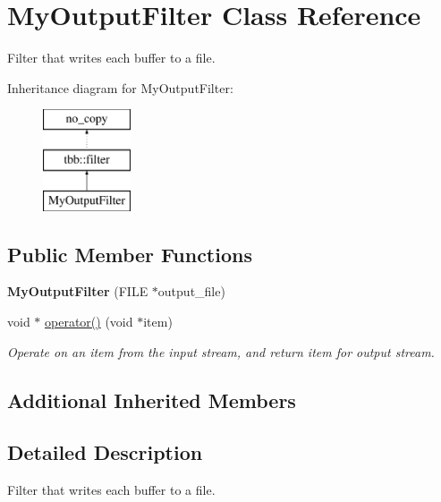 \hypertarget{classMyOutputFilter}{}\section{My\+Output\+Filter Class Reference}
\label{classMyOutputFilter}


Filter that writes each buffer to a file.  


Inheritance diagram for My\+Output\+Filter\+:\begin{figure}[H]
\begin{center}
\leavevmode
\includegraphics[height=3.000000cm]{classMyOutputFilter}
\end{center}
\end{figure}
\subsection*{Public Member Functions}
\begin{DoxyCompactItemize}
\item 
\hypertarget{classMyOutputFilter_acbfd306d9f83e508ab169829ef435c49}{}{\bfseries My\+Output\+Filter} (F\+I\+L\+E $\ast$output\+\_\+file)\label{classMyOutputFilter_acbfd306d9f83e508ab169829ef435c49}

\item 
void $\ast$ \hyperlink{classMyOutputFilter_a6102b27306e4bd5e55264b9c1fdee497}{operator()} (void $\ast$item)
\begin{DoxyCompactList}\small\item\em Operate on an item from the input stream, and return item for output stream. \end{DoxyCompactList}\end{DoxyCompactItemize}
\subsection*{Additional Inherited Members}


\subsection{Detailed Description}
Filter that writes each buffer to a file. 

